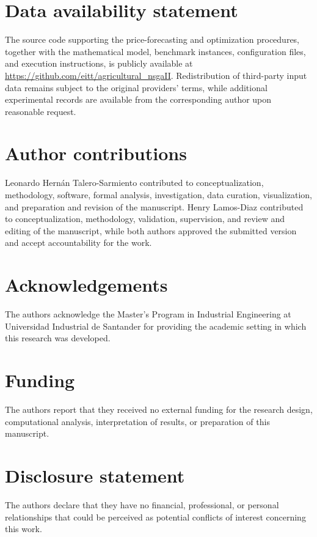 \documentclass[]{interact}
\begin{document}
\section*{Data availability statement}

The source code supporting the price-forecasting and optimization procedures, together with the mathematical model, benchmark instances, configuration files, and execution instructions, is publicly available at \url{https://github.com/eitt/agricultural_nsgaII}. Redistribution of third-party input data remains subject to the original providers' terms, while additional experimental records are available from the corresponding author upon reasonable request.

\section*{Author contributions}

Leonardo Hern\'an Talero-Sarmiento contributed to conceptualization, methodology, software, formal analysis, investigation, data curation, visualization, and preparation and revision of the manuscript. Henry Lamos-Diaz contributed to conceptualization, methodology, validation, supervision, and review and editing of the manuscript, while both authors approved the submitted version and accept accountability for the work.

\section*{Acknowledgements}

The authors acknowledge the Master's Program in Industrial Engineering at Universidad Industrial de Santander for providing the academic setting in which this research was developed.

\section*{Funding}

The authors report that they received no external funding for the research design, computational analysis, interpretation of results, or preparation of this manuscript.

\section*{Disclosure statement}

The authors declare that they have no financial, professional, or personal relationships that could be perceived as potential conflicts of interest concerning this work.
\end{document}
